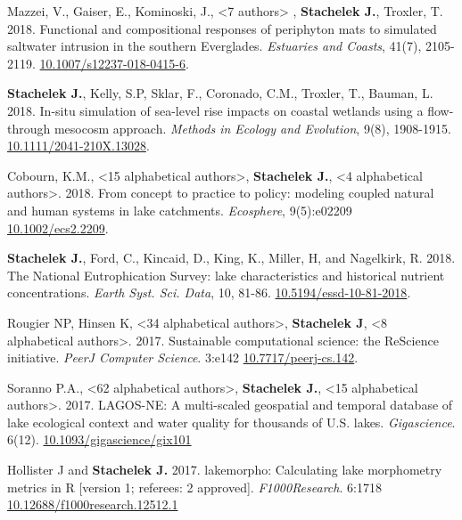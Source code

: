 \documentclass[11pt]{article}
\makeatletter
\newlength{\bibhang}
\newlength{\bibsep}
 {\@listi \global\bibsep\itemsep \global\advance\bibsep by\parsep}
\newenvironment{bibenum*}
  {\renewcommand\labelenumi{[\theenumi]}%
   \etaremune[
     topsep=0pt,
     itemsep=\bibsep,
     parsep=0pt,partopsep=0pt,
     itemindent=-\bibhang,
     leftmargin={\bibhang+\widthof{[999]}}]}
  {\endetaremune}
\makeatother
\begin{document}
\begin{bibenum*}
  \item Mazzei, V., Gaiser, E., Kominoski, J., <7 authors> , \textbf{Stachelek J.}, Troxler, T. 2018. Functional and compositional responses of periphyton mats to simulated saltwater intrusion in the southern Everglades. \emph{Estuaries and Coasts}, 41(7), 2105-2119. \href{https://doi.org/10.1007/s12237-018-0415-6}{10.1007/s12237-018-0415-6}.

  \item \textbf{Stachelek J.}, Kelly, S.P, Sklar, F., Coronado, C.M., Troxler, T., Bauman, L. 2018. In-situ simulation of sea-level rise impacts on coastal wetlands using a flow-through mesocosm approach. \emph{Methods in Ecology and Evolution}, 9(8), 1908-1915. \href{https://doi.org/10.1111/2041-210X.13028}{10.1111/2041-210X.13028}.

  \item Cobourn, K.M., <15 alphabetical authors>, \textbf{Stachelek J.}, <4 alphabetical authors>. 2018. From concept to practice to policy: modeling coupled natural and human systems in lake catchments. \emph{Ecosphere}, 9(5):e02209 \href{https://doi.org/10.1002/ecs2.2209}{10.1002/ecs2.2209}.

  \item \textbf{Stachelek J.}, Ford, C., Kincaid, D., King, K., Miller, H, and Nagelkirk, R. 2018. The National Eutrophication Survey: lake characteristics and historical nutrient concentrations. \emph{Earth Syst. Sci. Data}, 10, 81-86. \href{https://doi.org/10.5194/essd-10-81-2018}{10.5194/essd-10-81-2018}.

    \item Rougier NP, Hinsen K, <34 alphabetical authors>, \textbf{Stachelek J}, <8 alphabetical authors>. 2017. Sustainable computational science: the ReScience initiative. \emph{PeerJ Computer Science}. 3:e142 \href{https://doi.org/10.7717/peerj-cs.142}{10.7717/peerj-cs.142}.

    \item Soranno P.A., <62 alphabetical authors>, \textbf{Stachelek J.}, <15 alphabetical authors>. 2017. LAGOS-NE: A multi-scaled geospatial and temporal database of lake ecological context and water quality for thousands of U.S. lakes. \emph{Gigascience}. 6(12). \href{https://doi.org/10.1093/gigascience/gix101}{10.1093/gigascience/gix101}
    
    \item Hollister J and \textbf{Stachelek J.} 2017. lakemorpho: Calculating lake morphometry metrics in R [version 1; referees: 2 approved]. \emph{F1000Research}. 6:1718 \href{https://doi.org/10.12688/f1000research.12512.1}{10.12688/f1000research.12512.1}


\end{bibenum*}
\end{document}
